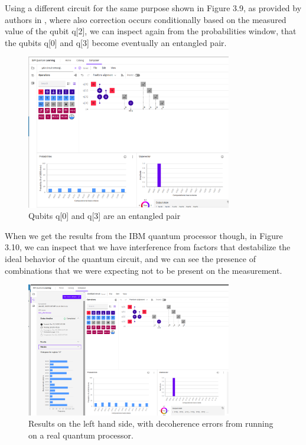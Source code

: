 \documentclass[12pt,a4paper] {report}
\begin{document}
		Using a different circuit for the same purpose shown in Figure 3.9, as provided by authors in \cite{brief-intro},
		where also correction occurs conditionally based on the measured value of the qubit q[2],
		we can inspect again from the probabilities window, that the qubits q[0] and q[3] become eventually an entangled pair.

		\begin{figure}[h!]
			\centering
			\includegraphics[width=0.8\textwidth]{ibmq/yale_circuit.png}
			\caption{Qubits q[0] and q[3] are an entangled pair}
			\label{fig:}
		\end{figure}		
		
		When we get the results from the IBM quantum processor though, in Figure 3.10, we can inspect that we have 
		interference from factors that destabilize the ideal behavior of the quantum circuit, 
		and we can see the presence of combinations that we were expecting not to be present
		on the measurement.

		\begin{figure}[h!]
			\centering
			\includegraphics[width=0.8\textwidth]{ibmq/real_entanglement.png}
			\caption{Results on the left hand side, with decoherence errors from running on a real quantum processor.}
			\label{fig:}
		\end{figure}		
		
\end{document}

